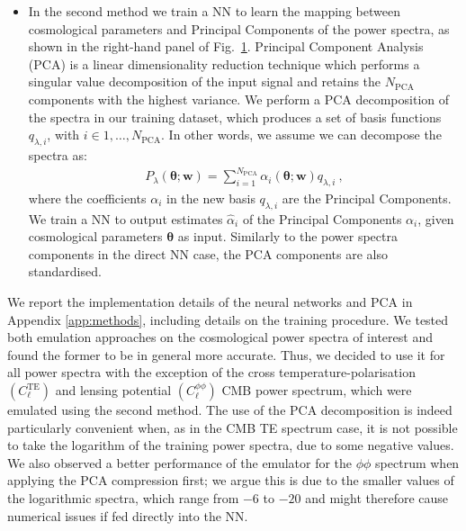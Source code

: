 \documentclass[fleqn,usenatbib]{mnras}
\begin{document}
\begin{itemize}
\begin{figure}
\begin{subfigure}{1.15\columnwidth}
    \caption[]%
            {}{}
  \end{subfigure}
    \caption{Schematic of the neural network emulation implemented in \textsc{CosmoPower}. A neural network is trained to learn the mapping between cosmological parameters and a) power spectra, b) coefficients in a Principal Component Analysis of the power spectra.}
    \label{fig:emulation}
\end{figure}
    \item In the second method we train a NN to learn the mapping between cosmological parameters and Principal Components of the power spectra, as shown in the right-hand panel of Fig.~\ref{fig:emulation}. Principal Component Analysis (PCA) is a linear dimensionality reduction technique which performs a singular value decomposition of the input signal and retains the $N_{\mathrm{PCA}}$ components with the highest variance. We perform a PCA decomposition of the spectra in our training dataset, which produces a set of basis functions $q_{\lambda, i}$, with $i \in 1, \dots , N_{\mathrm{PCA}}$. In other words, we assume we can decompose the spectra as:
    \begin{align}
        P_{\lambda}(\boldsymbol{\theta}; \boldsymbol{w}) = \sum_{i=1}^{N_{\mathrm{PCA}}} \alpha_i (\boldsymbol{\theta}; \boldsymbol{w}) q_{\lambda,i} \ ,
    \end{align}
     where the coefficients $\alpha_i$ in the new basis $q_{\lambda, i}$ are the Principal Components. We train a NN to output estimates $\hat{\alpha}_i$ of the Principal Components $\alpha_i$, given cosmological parameters $\boldsymbol{\theta}$ as input. Similarly to the power spectra components in the direct NN case, the PCA components are also standardised.
\end{itemize}
We report the implementation details of the neural networks and PCA in Appendix \ref{app:methods}, including details on the training procedure. We tested both emulation approaches on the cosmological power spectra of interest and found the former to be in general more accurate. Thus, we decided to use it for all power spectra with the exception of the cross temperature-polarisation $\left ( C_{\ell}^{\textrm{TE}} \right )$ and lensing potential $\left ( C_{\ell}^{\phi \phi} \right )$ CMB power spectrum, which were emulated using the second method. The use of the PCA decomposition is indeed particularly convenient when, as in the CMB TE spectrum case, it is not possible to take the logarithm of the training power spectra, due to some negative values. We also observed a better performance of the emulator for the $\phi \phi$ spectrum when applying the PCA compression first; we argue this is due to the smaller values of the logarithmic spectra, which range from $-6$ to $-20$ and might therefore cause numerical issues if fed directly into the NN.
\end{document}
